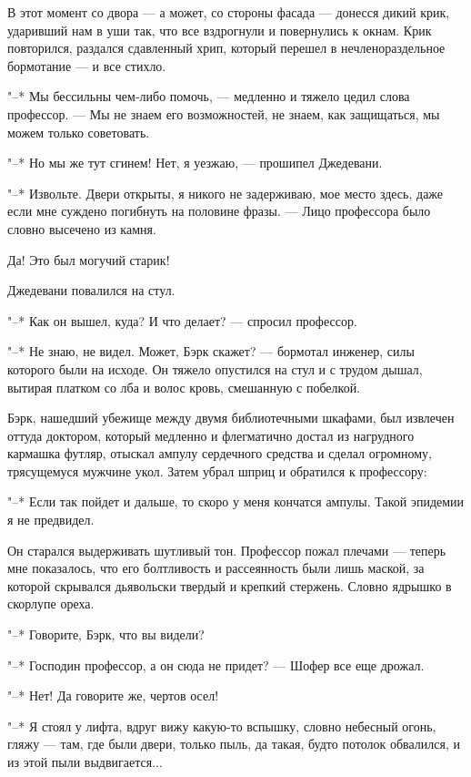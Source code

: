 В этот момент со двора --- а может, со стороны  фасада  ---  донесся  дикий
крик, ударивший нам в уши так, что все вздрогнули и повернулись  к  окнам.
Крик   повторился,   раздался   сдавленный   хрип,   который   перешел   в
нечленораздельное бормотание --- и все стихло.

"--* Мы бессильны  чем-либо  помочь,  ---  медленно  и  тяжело  цедил  слова
профессор. --- Мы не знаем его возможностей, не знаем,  как  защищаться,  мы
можем только советовать.

"--* Но мы же тут сгинем! Нет, я уезжаю, --- прошипел Джедевани.

"--* Извольте. Двери открыты, я никого не  задерживаю,  мое  место  здесь,
даже если мне суждено погибнуть на половине фразы. --- Лицо профессора  было
словно высечено из камня.

Да! Это был могучий старик!

Джедевани повалился на стул.

"--* Как он вышел, куда? И что делает? --- спросил профессор.

"--* Не знаю, не видел. Может,  Бэрк  скажет?  ---  бормотал  инженер,  силы
которого были на исходе. Он тяжело опустился на стул  и  с  трудом  дышал,
вытирая платком со лба и волос кровь, смешанную с побелкой.

Бэрк, нашедший убежище между двумя библиотечными шкафами, был  извлечен
оттуда доктором, который  медленно  и  флегматично  достал  из  нагрудного
кармашка футляр, отыскал ампулу сердечного средства  и  сделал  огромному,
трясущемуся мужчине укол. Затем убрал шприц и обратился к профессору:

"--* Если так пойдет и дальше, то скоро  у  меня  кончатся  ампулы.  Такой
эпидемии я не предвидел.

Он старался выдерживать шутливый тон. Профессор пожал плечами ---  теперь
мне показалось, что его болтливость и рассеянность были  лишь  маской,  за
которой скрывался дьявольски твердый и крепкий стержень. Словно ядрышко  в
скорлупе ореха.

"--* Говорите, Бэрк, что вы видели?

"--* Господин профессор, а он сюда не придет? --- Шофер все еще дрожал.

"--* Нет! Да говорите же, чертов осел!

"--* Я стоял у лифта, вдруг вижу какую-то вспышку, словно небесный  огонь,
гляжу --- там,  где  были  двери,  только  пыль,  да  такая,  будто  потолок
обвалился, и из этой пыли выдвигается...

